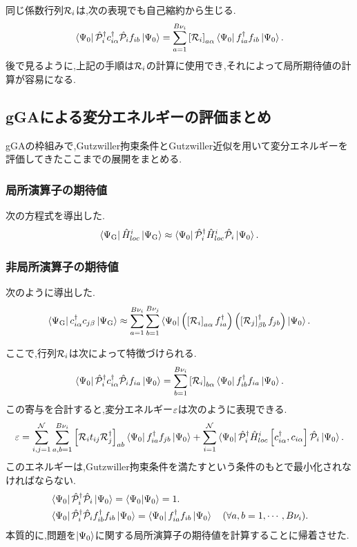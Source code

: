 同じ係数行列$\mathcal{R}_{i}$は,次の表現でも自己縮約から生じる.
\begin{equation}
    \Bra{\Psi_{0}}\hat{\mathcal{P}}^\dagger_{i}c^\dagger_{i\alpha}\hat{\mathcal{P}}_{i}f_{ib}\Ket{\Psi_{0}}=\sum_{a=1}^{B\nu_{i}}\left[ \mathcal{R}_{i} \right]_{a\alpha}\Bra{\Psi_{0}}f^\dagger_{ia}f_{ib}\Ket{\Psi_{0}}.
\end{equation}
後で見るように,上記の手順は$\mathcal{R}_{i}$の計算に使用でき,それによって局所期待値の計算が容易になる.

\subsection{gGAによる変分エネルギーの評価まとめ}
gGAの枠組みで,Gutzwiller拘束条件とGutzwiller近似を用いて変分エネルギーを評価してきたここまでの展開をまとめる.

\subsubsection{局所演算子の期待値}
次の方程式を導出した.
\begin{equation}
    \Bra{\Psi_{\text{G}}}\hat{H}^{i}_{loc}\Ket{\Psi_{\text{G}}}\approx \Bra{\Psi_{0}}\hat{\mathcal{P}}^\dagger_{i}\hat{H}^{i}_{loc}\hat{\mathcal{P}}_{i}\Ket{\Psi_{0}}.
\end{equation}

\subsubsection{非局所演算子の期待値}
次のように導出した.
\begin{equation}
    \Bra{\Psi_{\text{G}}}c^\dagger_{i\alpha}c_{j\beta}\Ket{\Psi_{\text{G}}}\approx \sum_{a=1}^{B\nu_{i}}\sum_{b=1}^{B\nu_{j}}\Bra{\Psi_{0}}\left( \left[ \mathcal{R}_{i} \right]_{a\alpha}f^\dagger_{ia} \right)\left( \left[ \mathcal{R}_{j} \right]^\dagger_{\beta b}f_{jb} \right)\Ket{\Psi_{0}}.
\end{equation}

ここで,行列$\mathcal{R}_{i}$は次によって特徴づけられる.
\begin{equation}
    \Bra{\Psi_{0}}\hat{\mathcal{P}}^\dagger_{i}c^\dagger_{i\alpha}\hat{\mathcal{P}}_{i}f_{ia}\Ket{\Psi_{0}}=\sum_{b=1}^{B\nu_{i}}\left[ \mathcal{R}_{i} \right]_{b\alpha}\Bra{\Psi_{0}}f^\dagger_{ib}f_{ia}\Ket{\Psi_{0}}.
\end{equation}
この寄与を合計すると,変分エネルギー$\varepsilon$は次のように表現できる.
\begin{equation}
    \varepsilon=\sum_{i,j=1}^{\mathcal{N}}\sum_{a,b=1}^{B\nu_{i}}\left[ \mathcal{R}_{i}t_{ij}\mathcal{R}^\dagger_{j} \right]_{ab}\Bra{\Psi_{0}}f^\dagger_{ia}f_{jb}\Ket{\Psi_{0}}+\sum_{i=1}^{\mathcal{N}}\Bra{\Psi_{0}}\hat{\mathcal{P}}^\dagger_{i}\hat{H}^{i}_{loc}\left[ c^\dagger_{i\alpha},c_{i\alpha} \right]\hat{\mathcal{P}}_{i}\Ket{\Psi_{0}}.
\end{equation}
このエネルギーは,Gutzwiller拘束条件を満たすという条件のもとで最小化されなければならない.
\begin{align}
    &\Bra{\Psi_{0}}\hat{\mathcal{P}}^\dagger_{i}\hat{\mathcal{P}}_{i}\Ket{\Psi_{0}}=\braket{\Psi_{0}}=1. \label{kousoku-1}\\ 
    &\Bra{\Psi_{0}}\hat{\mathcal{P}}^\dagger_{i}\hat{\mathcal{P}}_{i}f^\dagger_{ib}f_{ib}\Ket{\Psi_{0}}=\Bra{\Psi_{0}}f^\dagger_{ia}f_{ib}\Ket{\Psi_{0}} \quad (\forall a,b=1,\cdots,B\nu_{i}).\label{kousoku-2}
\end{align}
本質的に,問題を$\Ket{\Psi_{0}}$に関する局所演算子の期待値を計算することに帰着させた.